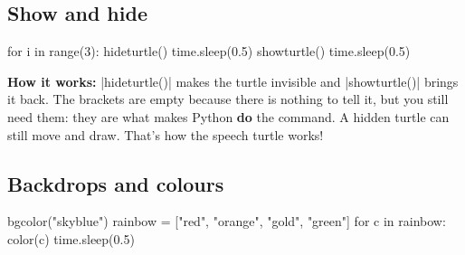 \subsection*{Show and hide}

\begin{tcbraster}[raster columns=2, raster equal height=rows, raster column skip=12pt, raster valign=center]
\begin{tcolorbox}[colback=white, colframe=white, boxrule=0pt, valign=center]
\begin{scratch}
\end{scratch}
\end{tcolorbox}
\begin{code}
for i in range(3):
    hideturtle()
    time.sleep(0.5)
    showturtle()
    time.sleep(0.5)
\end{code}
\end{tcbraster}

\textbf{How it works:} \py|hideturtle()| makes the turtle invisible and \py|showturtle()| brings it back. The brackets are empty because there is nothing to tell it, but you still need them: they are what makes Python \textbf{do} the command. A hidden turtle can still move and draw. That's how the speech turtle works!

\subsection*{Backdrops and colours}

\begin{tcbraster}[raster columns=2, raster equal height=rows, raster column skip=12pt, raster valign=center]
\begin{tcolorbox}[colback=white, colframe=white, boxrule=0pt, valign=center]
\begin{scratch}
\end{scratch}
\end{tcolorbox}
\begin{code}
bgcolor("skyblue")
rainbow = ["red", "orange",
           "gold", "green"]
for c in rainbow:
    color(c)
    time.sleep(0.5)
\end{code}
\end{tcbraster}

